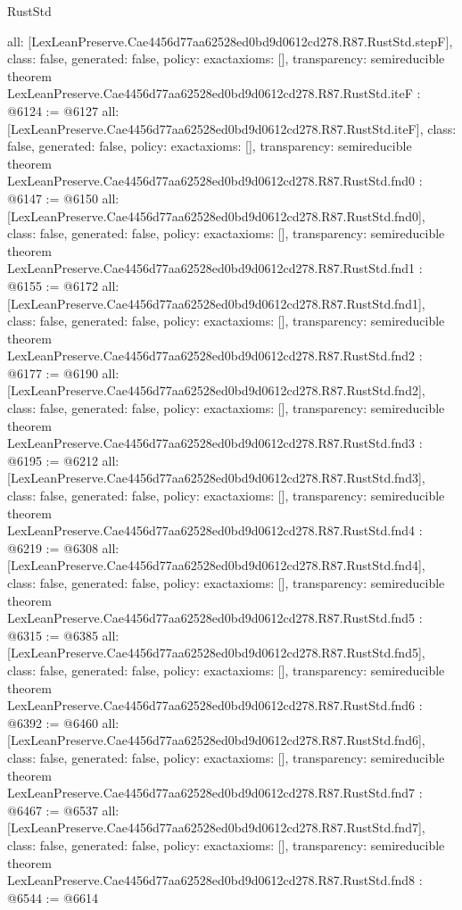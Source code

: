 \begin{lexlean}{RustStd}
\begin{coremodule}
{  all: [LexLeanPreserve.Cae4456d77aa62528ed0bd9d0612cd278.R87.RustStd.stepF],
  class: false,
  generated: false,
  policy: exact{axioms: []},
  transparency: semireducible
}
theorem LexLeanPreserve.Cae4456d77aa62528ed0bd9d0612cd278.R87.RustStd.iteF : @6124 := @6127 {
  all: [LexLeanPreserve.Cae4456d77aa62528ed0bd9d0612cd278.R87.RustStd.iteF],
  class: false,
  generated: false,
  policy: exact{axioms: []},
  transparency: semireducible
}
theorem LexLeanPreserve.Cae4456d77aa62528ed0bd9d0612cd278.R87.RustStd.fnd0 : @6147 := @6150 {
  all: [LexLeanPreserve.Cae4456d77aa62528ed0bd9d0612cd278.R87.RustStd.fnd0],
  class: false,
  generated: false,
  policy: exact{axioms: []},
  transparency: semireducible
}
theorem LexLeanPreserve.Cae4456d77aa62528ed0bd9d0612cd278.R87.RustStd.fnd1 : @6155 := @6172 {
  all: [LexLeanPreserve.Cae4456d77aa62528ed0bd9d0612cd278.R87.RustStd.fnd1],
  class: false,
  generated: false,
  policy: exact{axioms: []},
  transparency: semireducible
}
theorem LexLeanPreserve.Cae4456d77aa62528ed0bd9d0612cd278.R87.RustStd.fnd2 : @6177 := @6190 {
  all: [LexLeanPreserve.Cae4456d77aa62528ed0bd9d0612cd278.R87.RustStd.fnd2],
  class: false,
  generated: false,
  policy: exact{axioms: []},
  transparency: semireducible
}
theorem LexLeanPreserve.Cae4456d77aa62528ed0bd9d0612cd278.R87.RustStd.fnd3 : @6195 := @6212 {
  all: [LexLeanPreserve.Cae4456d77aa62528ed0bd9d0612cd278.R87.RustStd.fnd3],
  class: false,
  generated: false,
  policy: exact{axioms: []},
  transparency: semireducible
}
theorem LexLeanPreserve.Cae4456d77aa62528ed0bd9d0612cd278.R87.RustStd.fnd4 : @6219 := @6308 {
  all: [LexLeanPreserve.Cae4456d77aa62528ed0bd9d0612cd278.R87.RustStd.fnd4],
  class: false,
  generated: false,
  policy: exact{axioms: []},
  transparency: semireducible
}
theorem LexLeanPreserve.Cae4456d77aa62528ed0bd9d0612cd278.R87.RustStd.fnd5 : @6315 := @6385 {
  all: [LexLeanPreserve.Cae4456d77aa62528ed0bd9d0612cd278.R87.RustStd.fnd5],
  class: false,
  generated: false,
  policy: exact{axioms: []},
  transparency: semireducible
}
theorem LexLeanPreserve.Cae4456d77aa62528ed0bd9d0612cd278.R87.RustStd.fnd6 : @6392 := @6460 {
  all: [LexLeanPreserve.Cae4456d77aa62528ed0bd9d0612cd278.R87.RustStd.fnd6],
  class: false,
  generated: false,
  policy: exact{axioms: []},
  transparency: semireducible
}
theorem LexLeanPreserve.Cae4456d77aa62528ed0bd9d0612cd278.R87.RustStd.fnd7 : @6467 := @6537 {
  all: [LexLeanPreserve.Cae4456d77aa62528ed0bd9d0612cd278.R87.RustStd.fnd7],
  class: false,
  generated: false,
  policy: exact{axioms: []},
  transparency: semireducible
}
theorem LexLeanPreserve.Cae4456d77aa62528ed0bd9d0612cd278.R87.RustStd.fnd8 : @6544 := @6614 {
}
\end{coremodule}
\end{lexlean}
